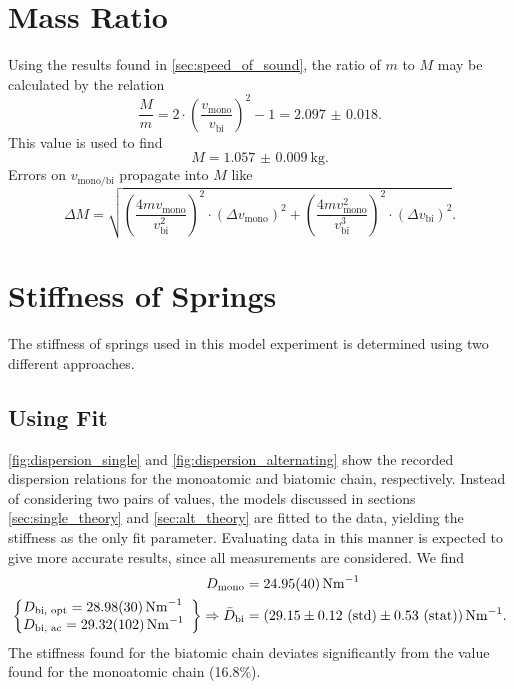 \section{Mass Ratio}
Using the results found in \autoref{sec:speed_of_sound}, the ratio of $m$ to $M$ may be calculated by the relation
\begin{equation*}
	\frac{M}{m} = 2\cdot\left(\frac{v_\text{mono}}{v_\text{bi}}\right)^2 -1 = \num{2.097(18)}.
\end{equation*}
This value is used to find
\begin{equation*}
	M = \SI{1.057(9)}{\kg}.
\end{equation*}
Errors on $v_\text{mono/bi}$ propagate into $M$ like
\begin{equation*}
	\Delta M = \sqrt{ \left(\frac{4mv_\text{mono}}{v_\text{bi}^2}\right)^2 \cdot (\Delta v_\text{mono})^2 + \left(\frac{4mv_\text{mono}^2}{v_\text{bi}^3}\right)^2 \cdot (\Delta v_\text{bi})^2 }.
\end{equation*}

\section{Stiffness of Springs}
The stiffness of springs used in this model experiment is determined using two different approaches.

\subsection{Using Fit}
\autoref{fig:dispersion_single} and \autoref{fig:dispersion_alternating} show the recorded dispersion relations for the monoatomic and biatomic chain, respectively.
Instead of considering two pairs of values, the models discussed in sections \ref{sec:single_theory} and \ref{sec:alt_theory} are fitted to the data, yielding the stiffness as the only fit parameter.
Evaluating data in this manner is expected to give more accurate results, since all measurements are considered.
We find
\begin{align*}
	D_\text{mono} &= \SI{24.95(40)}{\newton\meter^{-1}} \\
	\left\{ \begin{array}{@{}ll@{}}
		D_\text{bi, opt} = \SI{28.98(30)}{\newton\meter^{-1}} \\
		D_\text{bi, ac} = \SI{29.32(102)}{\newton\meter^{-1}}
	\end{array}\right\} \Rightarrow \bar{D}_\text{bi} &= \left(\num{29.15}\pm \num{0.12}\ \text{(std)}\pm \num{0.53}\ \text{(stat)}\right)\si{\newton\meter^{-1}}.
\end{align*}
The stiffness found for the biatomic chain deviates significantly from the value found for the monoatomic chain (\num{16.8}\%). 

